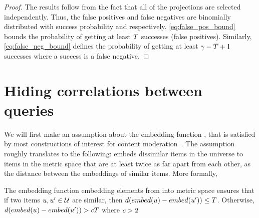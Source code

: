 \begin{proof}
The results follow from the fact that all of the projections are selected independently. Thus, the false positives and false negatives are binomially distributed with success probability \fpr and \fnr respectively. \eqref{eq:false_pos_bound} bounds the probability of getting at least $T$ successes (false positives). 
Similarly, \eqref{eq:false_neg_bound} defines the probability of getting at least $\gamma - T + 1$ successes where a success is a false negative. 

\end{proof}

\fi 


\iffalse
\section{Hiding correlations between queries}
\label{app:hiding_corr}
%


We will first make an assumption about the embedding function \embed, that is satisfied by most constructions of interest for content moderation~\cite{mckeown2023hamming,kulshrestha2021identifying}. The assumption roughly translates to the following: \embed embeds dissimilar items in the universe \universe to items in the metric space that are at least twice as far apart from each other, as the distance between the embeddings of similar items. 
More formally, 

\begin{assumption}
\label{assumption1}
The embedding function \embed embedding elements from \universe into metric space ensures that if two items $u, u' \in \mathcal{U}$ are similar, then $\distanceNotation[\distance][\embed(\genericUniverseElmt) - \embed(\genericUniverseElmtAlt)] \le \threshold$. Otherwise, 
$\distanceNotation[\distance][\embed(\genericUniverseElmt) - \embed(\genericUniverseElmtAlt)] > \lshConst\threshold$ where $c > 2$ 
\end{assumption}

